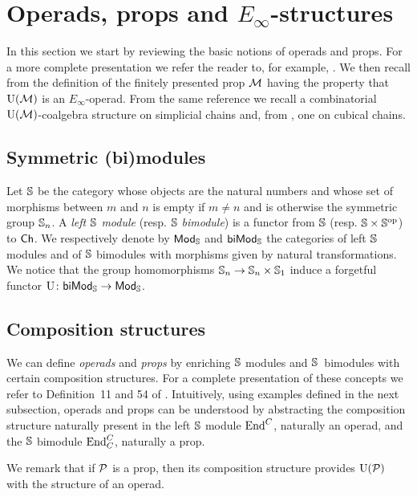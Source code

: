 
\section{Operads, props and \texorpdfstring{$E_\infty$}{}-structures} \label{s:operads and props}

In this section we start by reviewing the basic notions of operads and props.
For a more complete presentation we refer the reader to, for example, \cite{markl2008props}.
We then recall from \cite{medina2020prop1} the definition of the finitely presented prop $\M$ having the property that $\UM$ is an $E_{\infty}$-operad.
From the same reference we recall a combinatorial $\UM$-coalgebra structure on simplicial chains and, from \cite{medina2021cubical}, one on cubical chains.

\subsection{Symmetric (bi)modules}

Let $\S$ be the category whose objects are the natural numbers and whose set of morphisms between $m$ and $n$ is empty if $m \neq n$ and is otherwise the symmetric group $\S_n$.
A \textit{left $\S$ module} (resp. $\S$ \textit{bimodule}) is a functor from $\S$ (resp. $\S \times \S^\op$) to $\Ch$.
We respectively denote by $\smod$ and $\sbimod$ the categories of left $\S$ modules and of $\S$ bimodules with morphisms given by natural transformations.
We notice that the group homomorphisms $\S_n \to \S_n \times \S_1$ induce a forgetful functor $\U \colon \sbimod \to \smod$.

\subsection{Composition structures}

We can define \textit{operads} and \textit{props} by enriching $\S$ modules and \mbox{$\S$ bimodules} with certain composition structures.
For a complete presentation of these concepts we refer to Definition~11 and 54 of \cite{markl2008props}.
Intuitively, using examples defined in the next subsection, operads and props can be understood by abstracting the composition structure naturally present in the left $\S$ module $\End^C$, naturally an operad, and the $\S$ bimodule $\End^C_C$, naturally a prop.

We remark that if $\P$ is a prop, then its composition structure provides $\U(\P)$ with the structure of an operad.

